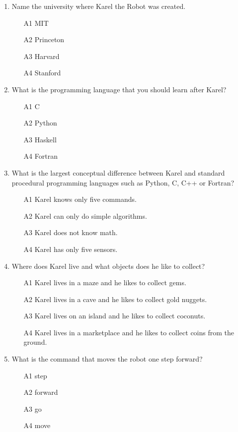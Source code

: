 \begin{enumerate}
\item Name the university where Karel the Robot was created.
\begin{enumerate}
\item[A1] MIT
\item[A2] Princeton
\item[A3] Harvard
\item[A4] Stanford
\end{enumerate}
\item What is the programming language that you should learn after Karel?
\begin{enumerate}
\item[A1] C
\item[A2] Python
\item[A3] Haskell
\item[A4] Fortran
\end{enumerate}
\item What is the largest conceptual difference between Karel and standard
      procedural programming languages such as Python, C, C++ or Fortran?
\begin{enumerate}
\item[A1] Karel knows only five commands.
\item[A2] Karel can only do simple algorithms.
\item[A3] Karel does not know math.
\item[A4] Karel has only five sensors.
\end{enumerate}
\item Where does Karel live and what objects does he like to collect?
\begin{enumerate}
\item[A1] Karel lives in a maze and he likes to collect gems.
\item[A2] Karel lives in a cave and he likes to collect gold nuggets.
\item[A3] Karel lives on an island and he likes to collect coconuts.
\item[A4] Karel lives in a marketplace and he likes to collect coins from the ground.
\end{enumerate}
\item What is the command that moves the robot one step forward?
\begin{enumerate}
\item[A1] step
\item[A2] forward
\item[A3] go
\item[A4] move

\end{enumerate}
\end{enumerate}
